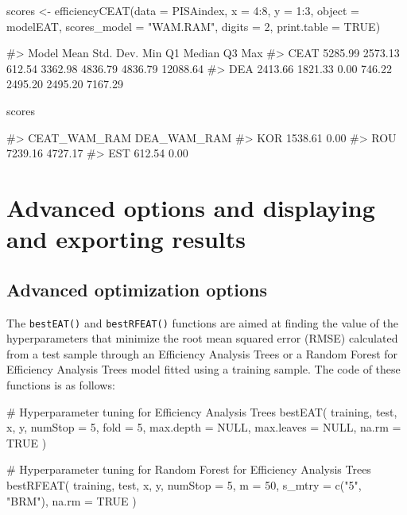 \begin{Schunk}
\begin{Sinput}
scores <- efficiencyCEAT(data = PISAindex, x = 4:8, y = 1:3, object = modelEAT,
                         scores_model = "WAM.RAM", digits = 2,
                         print.table = TRUE)
\end{Sinput}
\begin{Soutput}
#>  Model    Mean Std. Dev.    Min      Q1  Median      Q3      Max
#>   CEAT 5285.99   2573.13 612.54 3362.98 4836.79 4836.79 12088.64
#>    DEA 2413.66   1821.33   0.00  746.22 2495.20 2495.20  7167.29
\end{Soutput}
\begin{Sinput}
scores %>% sample_n(3)
\end{Sinput}
\begin{Soutput}
#>     CEAT_WAM_RAM DEA_WAM_RAM
#> KOR      1538.61        0.00
#> ROU      7239.16     4727.17
#> EST       612.54        0.00
\end{Soutput}
\end{Schunk}

\hypertarget{section6}{%
\section{Advanced options and displaying and exporting
results}\label{section6}}

\hypertarget{advanced-optimization-options}{%
\subsection{Advanced optimization
options}\label{advanced-optimization-options}}

The \texttt{bestEAT()} and \texttt{bestRFEAT()} functions are aimed at
finding the value of the hyperparameters that minimize the root mean
squared error (RMSE) calculated from a test sample through an Efficiency
Analysis Trees or a Random Forest for Efficiency Analysis Trees model
fitted using a training sample. The code of these functions is as
follows:

\begin{Schunk}
\begin{Sinput}
# Hyperparameter tuning for Efficiency Analysis Trees
bestEAT(
  training, test, x, y,
  numStop = 5, fold = 5,
  max.depth = NULL,
  max.leaves = NULL,
  na.rm = TRUE
  )

# Hyperparameter tuning for Random Forest for Efficiency Analysis Trees
bestRFEAT(
  training, test, x, y,
  numStop = 5, m = 50,
  s_mtry = c("5", "BRM"), 
  na.rm = TRUE
  )
\end{Sinput}
\end{Schunk}


